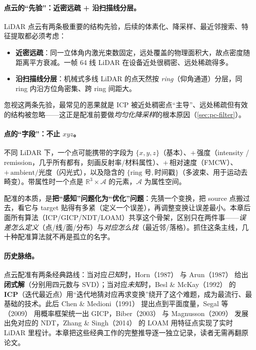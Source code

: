 \paragraph{点云的“先验”：近密远疏 + 沿扫描线分层。}
LiDAR 点云有两条极重要的结构先验，后续的体素化、降采样、最近邻搜索、特征提取都必须考虑\cite{carlone2026handbook}：
\begin{itemize}
  \item \textbf{近密远疏}：同一立体角内激光束数固定，远处覆盖的物理面积大，故点密度随距离平方衰减。一帧 64 线 LiDAR 在设备近处很稠密、远处稀疏得多。
  \item \textbf{沿扫描线分层}：机械式多线 LiDAR 的点天然按 \emph{ring}（仰角通道）分层，同 ring 内沿方位角密集、跨 ring 间距大。
\end{itemize}
忽视这两条先验，最常见的恶果就是 ICP 被近处稠密点“主导”、远处稀疏但有效的结构被忽略——这正是配准前要做\emph{均匀化降采样}的根本原因（\cref{sec:pc-filter}）。

\paragraph{点的“字段”：不止 $xyz$。}
不同 LiDAR 下，一个点可能携带的字段为 $\{x,y,z\}$（基本）、$+\,\text{强度}$（intensity / remission，几乎所有都有，刻画反射率/材料属性）、$+\,\text{相对速度}$（FMCW）、$+\,\text{ambient/光度}$（闪光式），以及隐含的 $\{\text{ring 号},\text{时间戳}\}$（多波束、用于运动去畸变）\cite{carlone2026handbook}。带属性时一个点是 $\mathbb{R}^3\times\mathcal{A}$ 的元素，$\mathcal{A}$ 为属性空间。

\begin{insight}
配准的本质，是\textbf{把“感知”问题化为“优化”问题}：先猜一个变换，把 source 点搬过去，看它与 target 贴得有多紧（定义一个误差），再调整变换让误差最小。本章后面所有算法（ICP/GICP/NDT/LOAM）共享这个骨架，区别只在两件事——\emph{误差怎么定义}（点/线/面/分布）与\emph{对应怎么找}（最近邻/落格）。抓住这条主线，几十种配准算法就不再是孤立的名字。
\end{insight}

\paragraph{历史脉络。}
点云配准有两条经典路线\cite{carlone2026handbook}：当对应\emph{已知}时，Horn（1987）\cite{horn1987absolute} 与 Arun（1987）\cite{arun1987leastsquares} 给出\textbf{闭式解}（分别用四元数与 SVD）；当对应\emph{未知}时，Besl \& McKay（1992）\cite{besl1992icp} 的 \textbf{ICP}（迭代最近点）用“迭代地猜对应再求变换”绕开了这个难题，成为最流行、最基础的技术。此后 Chen \& Medioni（1991）\cite{chen1992pointplane} 提出点到平面度量，Segal 等（2009）\cite{segal2009gicp} 用概率框架统一出 GICP，Biber（2003）\cite{biber2003ndt} 与 Magnusson（2009）\cite{magnusson2009ndt} 发展出免对应的 NDT，Zhang \& Singh（2014）\cite{zhang2014loam} 的 LOAM 用特征点实现了实时 LiDAR 里程计。本章把这些经典工作的完整推导逐一独立记录，读者无需再翻原论文。

